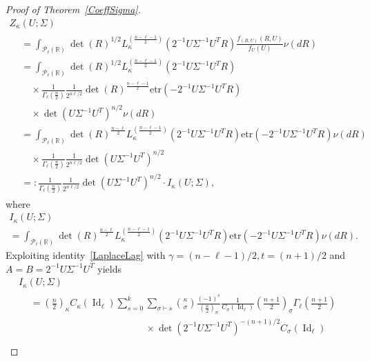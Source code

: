 \documentclass[AHL,Unicode,longabstracts,published]{cedram}
\DeclareMathOperator{\Id}{Id}
\newcommand{\clP}{\mathcal{P}}
\newcommand{\R}{\mathbb{R}}
\newcommand{\etr}[1]{\mathrm{etr}\left(#1\right)}
\begin{document}
\begin{proof}[Proof of Theorem~\ref{CoeffSigma}]
\break
\begin{multline}\label{ZUexp}
Z_{\kappa}(U;\Sigma)\\
\begin{aligned}
&= \int_{\clP_{\ell}(\R)} \det(R)^{1/2} L_{\kappa}^{\left(\frac{n-\ell-1}{2}\right)}\left(2^{-1}U\Sigma^{-1}U^TR\right)
\frac{f_{(R,U)}(R,U)}{f_U(U)} \nu(dR)\\
&= \int_{\clP_{\ell}(\R)} \det(R)^{1/2} L_{\kappa}^{\left(\frac{n-\ell-1}{2}\right)}\left(2^{-1}U\Sigma^{-1}U^TR\right)
\\
& \quad\times \frac{1}{\Gamma_{\ell}(\frac{n}{2})}
\frac{1}{2^{n\ell/2}} \det(R)^{\frac{n-\ell-1}{2}}
\etr{ -2^{-1}U\Sigma^{-1}U^TR} \\
& \quad\times \det\left(U\Sigma^{-1}U^T\right)^{ n/2} \nu(dR) \\
&=\int_{\clP_{\ell}(\R)} \det(R)^{\frac{n-\ell}{2}} L_{\kappa}^{\left(\frac{n-\ell-1}{2}\right)}\left(2^{-1}U\Sigma^{-1}U^TR\right)
\etr{ -2^{-1}U\Sigma^{-1}U^TR} \nu(dR)\\
&\quad\times \frac{1}{\Gamma_{\ell}\left(\frac{n}{2}\right)}
\frac{1}{2^{n\ell/2}} \det\left(U\Sigma^{-1}U^T\right)^{ n/2}\\
&=:\frac{1}{\Gamma_{\ell}\left(\frac{n}{2}\right)}
\frac{1}{2^{n\ell/2}} \det\left(U\Sigma^{-1}U^T\right)^{ n/2} \cdot I_{\kappa}(U;\Sigma),
\end{aligned}
\end{multline}
where
\begin{multline}\label{I}
I_{\kappa}(U;\Sigma)\\
=\int_{\clP_{\ell}(\R)} \det(R)^{\frac{n-\ell}{2}} L_{\kappa}^{\left(\frac{n-\ell-1}{2}\right)}\left(2^{-1}U\Sigma^{-1}U^TR\right)
\etr{ -2^{-1}U\Sigma^{-1}U^TR} \nu(dR).
\end{multline}
Exploiting identity~\eqref{LaplaceLag} with $\gamma=(n-\ell-1)/2, t=(n+1)/2$ and $A=B=2^{-1}U\Sigma^{-1}U^T$ yields
\begin{multline*}
I_{\kappa}(U;\Sigma)\\
\begin{aligned}
&=\left(\frac{n}{2}\right)_{\kappa} C_{\kappa}(\Id_{\ell})
\sum_{s=0}^{k} \sum_{\sigma \vdash s} \binom{\kappa}{\sigma} \frac{(-1)^s}{\left(\frac{n}{2}\right)_{\sigma}}\frac{1}{C_{\sigma}(\Id_{\ell})}
\left(\frac{n+1}{2}\right)_{\sigma} \Gamma_{\ell}\left(\frac{n+1}{2}\right) \\
&\hspace{5cm}\times \det\left(2^{-1}U\Sigma^{-1}U^T\right)^{-(n+1)/2}C_{\sigma}(\Id_{\ell}) \\

\end{aligned}
\end{multline*}
\end{proof}
\end{document}
